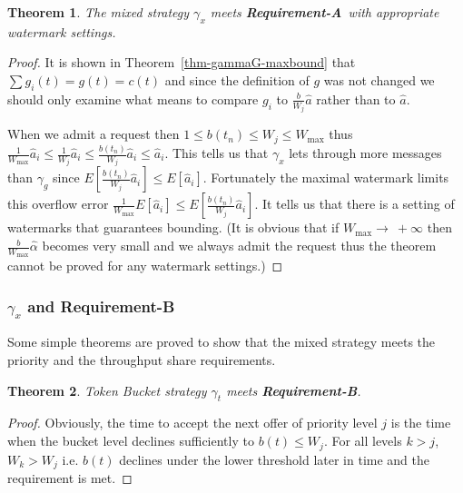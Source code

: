 \documentclass[conference]{IEEEtran}
\newtheorem{theorem}{Theorem}
\newcommand{\comment}[1]{}
\newcommand{\PP}{\mathds{P}}
\newcommand{\toinf}{\rightarrow~+\infty}
\newcommand{\ha}{\hat{\alpha}}
\newcommand{\reqA}{\textbf{Requirement-A}}
\newcommand{\reqB}{\textbf{Requirement-B}}
\begin{document}
\begin{theorem}\label{thm-gammaX-maxbound} The mixed strategy $\gamma_x$ meets
\reqA\ with appropriate watermark settings.
\end{theorem}

\begin{proof} It is shown in Theorem~\ref{thm-gammaG-maxbound} that
$\sum g_i(t)=g(t)=c(t)$ and since the definition of $g$ was not
changed we should only examine what means to compare $g_i$ to
$\frac{b}{W_j}\hat{a}$ rather than to $\hat{a}$.

When we admit a request then $1\leq b(t_n)\leq W_j\leq W_{\max}$
thus $\frac{1}{W_{\max}} \hat{a}_i\leq\frac{1}{W_j}
\hat{a}_i\leq\frac{b(t_n)}{W_j}\hat{a}_i\leq\hat{a}_i$. This tells
us that $\gamma_x$ lets through more messages than $\gamma_g$ since
$E[\frac{b(t_n)}{W_j}\hat{a}_i]\leq E[\hat{a}_i]$. Fortunately the
maximal watermark limits this overflow error $\frac{1}{W_{\max}}
E[\hat{a}_i]\leq E[\frac{b(t_n)}{W_j}\hat{a}_i]$. It tells us that
there is a setting of watermarks that guarantees bounding. (It is
obvious that if $W_{\max}\toinf$ then $\frac{b}{W_{\max}}\ha$
becomes very small and we always admit the request thus the theorem
cannot be proved for any watermark settings.) \end{proof}

\comment{ AN IDEA: Show that $r<\lambda\Rightarrow\PP[b<W]=0$.
Obviously for $r<\lambda\Rightarrow\PP[b=W]=0$ so this algorithm has
better throughput than the normal rate based call gapping.

This is the reason why simulations shows that this algorithm has the
best throughput.}

\subsubsection{$\gamma_x$ and Requirement-B}
Some simple theorems are proved to show that the mixed strategy
meets the priority and the throughput share requirements.

\begin{theorem}
Token Bucket strategy $\gamma_t$ meets \reqB.
\end{theorem}

\begin{proof} Obviously, the time to accept the next offer of priority level
$j$ is the time when the bucket level declines sufficiently to
$b(t)\leq W_j$. For all levels $k>j$, $W_k>W_j$ i.e. $b(t)$ declines
under the lower threshold later in time and the requirement is
met.\end{proof}
\end{document}
